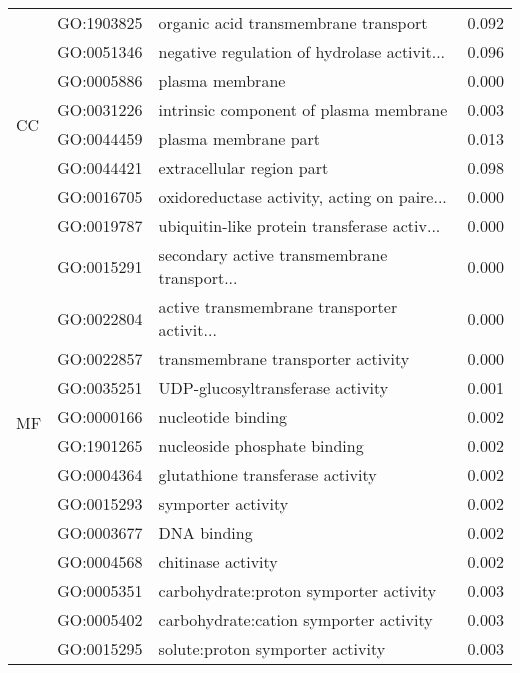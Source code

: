 \begin{longtable}{lllr}
   & GO:1903825 &         organic acid transmembrane transport &         0.092 \\
   & GO:0051346 &  negative regulation of hydrolase activit... &         0.096 \\
\cline{1-4}
\multirow{4}{*}{CC} & GO:0005886 &                              plasma membrane &         0.000 \\
   & GO:0031226 &       intrinsic component of plasma membrane &         0.003 \\
   & GO:0044459 &                         plasma membrane part &         0.013 \\
   & GO:0044421 &                    extracellular region part &         0.098 \\
\cline{1-4}
\multirow{62}{*}{MF} & GO:0016705 &  oxidoreductase activity, acting on paire... &         0.000 \\
   & GO:0019787 &  ubiquitin-like protein transferase activ... &         0.000 \\
   & GO:0015291 &  secondary active transmembrane transport... &         0.000 \\
   & GO:0022804 &  active transmembrane transporter activit... &         0.000 \\
   & GO:0022857 &           transmembrane transporter activity &         0.000 \\
   & GO:0035251 &             UDP-glucosyltransferase activity &         0.001 \\
   & GO:0000166 &                           nucleotide binding &         0.002 \\
   & GO:1901265 &                 nucleoside phosphate binding &         0.002 \\
   & GO:0004364 &             glutathione transferase activity &         0.002 \\
   & GO:0015293 &                           symporter activity &         0.002 \\
   & GO:0003677 &                                  DNA binding &         0.002 \\
   & GO:0004568 &                           chitinase activity &         0.002 \\
   & GO:0005351 &       carbohydrate:proton symporter activity &         0.003 \\
   & GO:0005402 &       carbohydrate:cation symporter activity &         0.003 \\
   & GO:0015295 &             solute:proton symporter activity &         0.003 \\

\end{longtable}
